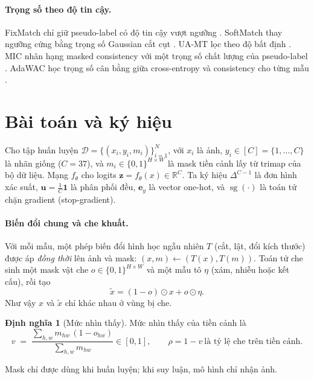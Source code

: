 \documentclass[11pt,a4paper]{article}
\theoremstyle{plain}
\theoremstyle{definition}
\newtheorem{definition}{Định nghĩa}
\theoremstyle{remark}
\newcommand{\R}{\mathbb{R}}
\newcommand{\Simplex}{\Delta^{C-1}}
\newcommand{\sg}{\operatorname{sg}}
\newcommand{\bu}{\bm{u}}
\newcommand{\bz}{\bm{z}}
\newcommand{\be}{\bm{e}}
\newcommand{\xt}{\tilde{x}}
\begin{document}
\paragraph{Trọng số theo độ tin cậy.} FixMatch chỉ giữ pseudo-label có độ tin cậy vượt ngưỡng \cite{sohn2020fixmatch}. SoftMatch thay ngưỡng cứng bằng trọng số Gaussian cắt cụt \cite{chen2023softmatch}. UA-MT lọc theo độ bất định \cite{yu2019uncertainty}. MIC nhân hạng masked consistency với một trọng số chất lượng của pseudo-label \cite{hoyer2023mic}. AdaWAC học trọng số cân bằng giữa cross-entropy và consistency cho từng mẫu \cite{dong2023adawac}.

\section{Bài toán và ký hiệu}
\label{sec:setup}

Cho tập huấn luyện $\mathcal{D}=\{(x_i,y_i,m_i)\}_{i=1}^N$, với $x_i$ là ảnh, $y_i\in[C]=\{1,\dots,C\}$ là nhãn giống ($C=37$), và $m_i\in\{0,1\}^{H\times W}$ là mask tiền cảnh lấy từ trimap của bộ dữ liệu. Mạng $f_\theta$ cho logits $\bz=f_\theta(x)\in\R^C$. Ta ký hiệu $\Simplex$ là đơn hình xác suất, $\bu=\tfrac{1}{C}\mathbf{1}$ là phân phối đều, $\be_y$ là vector one-hot, và $\sg(\cdot)$ là toán tử chặn gradient (stop-gradient).

\paragraph{Biến đổi chung và che khuất.} Với mỗi mẫu, một phép biến đổi hình học ngẫu nhiên $T$ (cắt, lật, đổi kích thước) được áp \emph{đồng thời} lên ảnh và mask: $(x,m)\leftarrow(T(x),T(m))$. Toán tử che sinh một mask vật che $o\in\{0,1\}^{H\times W}$ và một mẫu tô $\eta$ (xám, nhiễu hoặc kết cấu), rồi tạo
\begin{equation}
  \xt = (1-o)\odot x + o\odot \eta .
\end{equation}
Như vậy $x$ và $\xt$ chỉ khác nhau ở vùng bị che.

\begin{definition}[Mức nhìn thấy]
Mức nhìn thấy của tiền cảnh là
\begin{equation}
  v \;=\; \frac{\sum_{h,w} m_{hw}\,(1-o_{hw})}{\sum_{h,w} m_{hw}} \in[0,1],
  \qquad \rho = 1-v \ \text{là tỷ lệ che trên tiền cảnh.}
\end{equation}
\end{definition}

Mask chỉ được dùng khi huấn luyện; khi suy luận, mô hình chỉ nhận ảnh.
\end{document}
